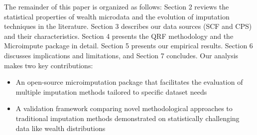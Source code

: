 The remainder of this paper is organized as follows: Section 2 reviews the statistical properties of wealth microdata and the evolution of imputation techniques in the literature. Section 3 describes our data sources (SCF and CPS) and their characteristics. Section 4 presents the QRF methodology and the Microimpute package in detail. Section 5 presents our empirical results. Section 6 discusses implications and limitations, and Section 7 concludes.
Our analysis makes two key contributions:
\begin{itemize}
    \item An open-source microimputation package that facilitates the evaluation of multiple imputation methods tailored to specific dataset needs
    \item A validation framework comparing novel methodological approaches to traditional imputation methods demonstrated on statistically challenging data like wealth distributions
\end{itemize}